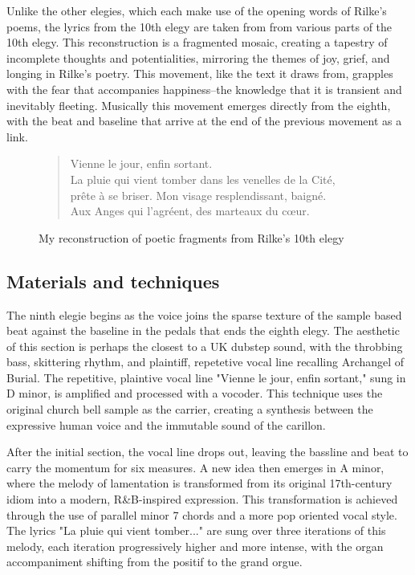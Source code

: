 \documentclass[12pt,twoside,maitrise]{dms_ks}
\theoremstyle{definition}
\begin{document}
{Unlike the other elegies, which each make use of the opening words of Rilke's poems, the lyrics from the 10th elegy are taken from from various parts of the 10th elegy. 
This reconstruction is a fragmented mosaic, creating a tapestry of incomplete thoughts and potentialities, mirroring the themes of joy, grief, and longing in Rilke’s poetry. 
This movement, like the text it draws from, grapples with the fear that accompanies happiness--the knowledge that it is transient and inevitably fleeting. 
Musically this movement emerges directly from the eighth, with the beat and baseline that arrive at the end of the previous movement as a link.

\begin{figure}[H]
\begin{verse}
Vienne le jour, enfin sortant.\\ 
La pluie qui vient tomber dans les venelles de la Cité,\\ 
prête à se briser. Mon visage resplendissant, baigné.\\ 
Aux Anges qui l'agréent, des marteaux du cœur.\\
\end{verse}  
\caption{My reconstruction of poetic fragments from Rilke's 10th elegy} 
\end{figure}

\subsection{Materials and techniques}

The ninth elegie begins as the voice joins the sparse texture of the sample based beat against the baseline in the pedals that ends the eighth elegy. 
The aesthetic of this section is perhaps the closest to a UK dubstep sound, with the throbbing bass, skittering rhythm, and plaintiff, repetetive vocal line recalling Archangel of Burial. 
The repetitive, plaintive vocal line "Vienne le jour, enfin sortant," sung in D minor, is amplified and processed with a vocoder. 
This technique uses the original church bell sample as the carrier, creating a synthesis between the expressive human voice and the immutable sound of the carillon.


After the initial section, the vocal line drops out, leaving the bassline and beat to carry the momentum for six measures. 
A new idea then emerges in A minor, where the melody of lamentation is transformed from its original 17th-century idiom into a modern, R\&B-inspired expression. 
This transformation is achieved through the use of parallel minor 7 chords and a more pop oriented vocal style. 
The lyrics "La pluie qui vient tomber..." are sung over three iterations of this melody, each iteration progressively higher and more intense, with the organ accompaniment shifting from the positif to the grand orgue.

}
\end{document}
